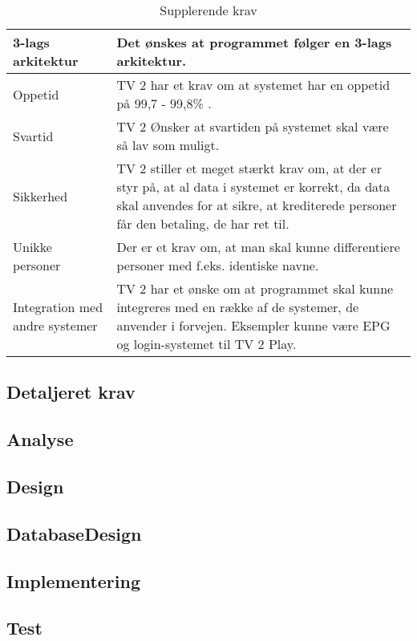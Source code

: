 \begin{table}[H]
\centering
\begin{tabular}{|p{40mm}|p{100mm}|}
\hline

    3-lags arkitektur & Det ønskes at programmet følger en 3-lags arkitektur.
\\ \hline
    Oppetid &  TV 2 har et krav om at systemet har en oppetid på 99,7 - 99,8\% .
\\ \hline
    Svartid & TV 2 Ønsker at svartiden på systemet skal være så lav som muligt.
\\ \hline
    Sikkerhed & TV 2 stiller et meget stærkt krav om, at der er styr på, at al data i systemet er korrekt, da data skal anvendes for at sikre, at krediterede personer får den betaling, de har ret til.
\\ \hline
    Unikke personer & Der er et krav om, at man skal kunne differentiere personer med f.eks. identiske navne.
\\ \hline
    Integration med andre systemer & TV 2 har et ønske om at programmet skal kunne integreres med en række af de systemer, de anvender i forvejen. Eksempler kunne være EPG og login-systemet til TV 2 Play.
\\ \hline
\end{tabular}
    \caption{Supplerende krav}
    \label{tab:Supplerende_krav}
\end{table}




\subsection{Detaljeret krav}

\subsection{Analyse}

\subsection{Design}

\subsection{DatabaseDesign}

\subsection{Implementering}

\subsection{Test}